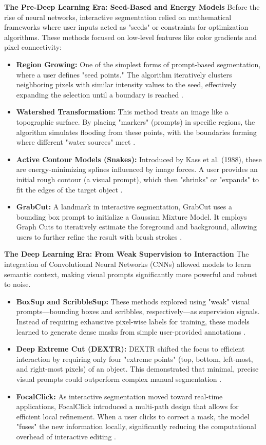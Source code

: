 \textbf{The Pre-Deep Learning Era: Seed-Based and Energy Models}
Before the rise of neural networks, interactive segmentation relied on mathematical frameworks where user inputs acted as "seeds" or constraints for optimization algorithms. These methods focused on low-level features like color gradients and pixel connectivity:
\begin{itemize}
	\item \textbf{Region Growing:} One of the simplest forms of prompt-based segmentation, where a user defines "seed points." The algorithm iteratively clusters neighboring pixels with similar intensity values to the seed, effectively expanding the selection until a boundary is reached \cite{region_growing_2014}.
	\item \textbf{Watershed Transformation:} This method treats an image like a topographic surface. By placing "markers" (prompts) in specific regions, the algorithm simulates flooding from these points, with the boundaries forming where different "water sources" meet \cite{watershed_1979}.
	\item \textbf{Active Contour Models (Snakes):} Introduced by Kass et al. (1988), these are energy-minimizing splines influenced by image forces. A user provides an initial rough contour (a visual prompt), which then "shrinks" or "expands" to fit the edges of the target object \cite{snakes_1988}.
	\item \textbf{GrabCut:} A landmark in interactive segmentation, GrabCut uses a bounding box prompt to initialize a Gaussian Mixture Model. It employs Graph Cuts to iteratively estimate the foreground and background, allowing users to further refine the result with brush strokes \cite{grab_cut_2004}.
\end{itemize}

\textbf{The Deep Learning Era: From Weak Supervision to Interaction}
The integration of Convolutional Neural Networks (CNNs) allowed models to learn semantic context, making visual prompts significantly more powerful and robust to noise.
\begin{itemize}
	\item \textbf{BoxSup and ScribbleSup:} These methods explored using "weak" visual prompts—bounding boxes and scribbles, respectively—as supervision signals. Instead of requiring exhaustive pixel-wise labels for training, these models learned to generate dense masks from simple user-provided annotations \cite{box_sup_2015, scribble_sup_2016}.
	\item \textbf{Deep Extreme Cut (DEXTR):} DEXTR shifted the focus to efficient interaction by requiring only four "extreme points" (top, bottom, left-most, and right-most pixels) of an object. This demonstrated that minimal, precise visual prompts could outperform complex manual segmentation \cite{deep_extreme_cut_2018}.
	\item \textbf{FocalClick:} As interactive segmentation moved toward real-time applications, FocalClick introduced a multi-path design that allows for efficient local refinement. When a user clicks to correct a mask, the model "fuses" the new information locally, significantly reducing the computational overhead of interactive editing \cite{focal_click_2022}.
\end{itemize}

